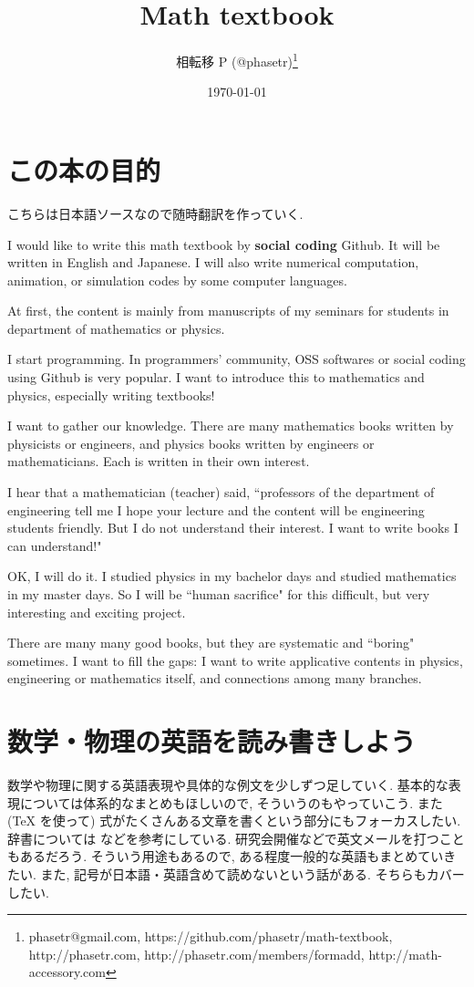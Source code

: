 \documentclass[openany, a4paper, oneside]{jsbook}
\author{相転移 P (@phasetr)\thanks{phasetr@gmail.com, https://github.com/phasetr/math-textbook, http://phasetr.com, http://phasetr.com/members/formadd, http://math-accessory.com}}
\date{\today}
\title{Math textbook}
\begin{document}
\maketitle
\tableofcontents


\part{この本の目的}

こちらは日本語ソースなので随時翻訳を作っていく.

I would like to write this math textbook by \textbf{social coding} Github.
It will be written in English and Japanese.
I will also write numerical computation, animation,
or simulation codes by some computer languages.

At first, the content is mainly from manuscripts
of my seminars for students in department of mathematics or physics.

I start programming.
In programmers' community, OSS softwares or social coding using Github
is very popular.
I want to introduce this to mathematics and physics,
especially writing textbooks!

I want to gather our knowledge.
There are many mathematics books written by physicists or engineers,
and physics books written by engineers or mathematicians.
Each is written in their own interest.

I hear that a mathematician (teacher) said,
``professors of the department of engineering tell me
I hope your lecture and the content will be engineering students friendly.
But I do not understand their interest.
I want to write books I can understand!"

OK, I will do it.
I studied physics in my bachelor days and studied mathematics
in my master days.
So I will be ``human sacrifice" for this difficult, but very
interesting and exciting project.

There are many many good books,
but they are systematic and ``boring" sometimes.
I want to fill the gaps:
I want to write applicative contents in physics, engineering or mathematics itself,
and connections among many branches.
\part{数学・物理の英語を読み書きしよう}

数学や物理に関する英語表現や具体的な例文を少しずつ足していく.
基本的な表現については体系的なまとめもほしいので, そういうのもやっていこう.
また (\TeX{} を使って) 式がたくさんある文章を書くという部分にもフォーカスしたい.
辞書については \cite{YusakuKomatsu1} などを参考にしている.
研究会開催などで英文メールを打つこともあるだろう.
そういう用途もあるので, ある程度一般的な英語もまとめていきたい.
また, 記号が日本語・英語含めて読めないという話がある.
そちらもカバーしたい.
\end{document}
